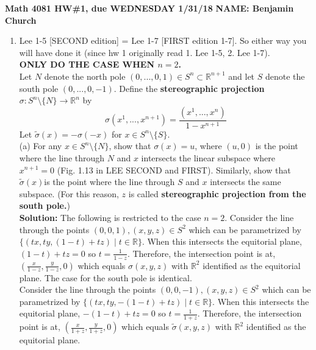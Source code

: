 \documentclass[12pt]{extarticle}
\newcommand{\R}{\mathbb{R}}
\begin{document}
\pagestyle{empty}

{\bf Math 4081 HW\#1, due WEDNESDAY 1/31/18} \hspace{.5in} \textbf{NAME: Benjamin Church} \hspace{4in}
\begin{enumerate}
\item Lee 1-5 [SECOND edition] = Lee 1-7 [FIRST edition 1-7].  So either way you will have done it (since hw 1 originally read 1. Lee 1-5, 2. Lee 1-7). \\


 \textbf{ONLY DO THE CASE WHEN $n=2$.}\\

Let $N$ denote the north pole $(0,...,0,1) \in S^n \subset \R^{n+1}$   and let $S$ denote the south pole $(0,...,0,-1)$. Define the \textbf{stereographic projection} $\sigma: S^n\setminus \{N\} \to \R^n$ by  
\[
\sigma(x^1,...,x^{n+1}) = \frac{(x^1,...,x^{n})}{1-x^{n+1}}
\]
Let $\widetilde{\sigma}(x) = -\sigma(-x)$ for $x\in S^n \setminus \{ S \}$. \\
(a) For any $x\in S^n \setminus \{N\}$, show that $\sigma(x)=u$, where $(u,0)$ is the point where the line through $N$ and $x$ intersects the linear subspace where $x^{n+1}=0$ (Fig. 1.13 in LEE SECOND and FIRST). Similarly, show that  $\widetilde{\sigma}(x) $is the point where the line through $S$ and $x$ intersects the same subspace. (For this reason,  $z$ is called \textbf{stereographic projection from the south pole.}) \\

\textbf{Solution:}
The following is restricted to the case $n = 2$.
Consider the line through the points $(0, 0, 1), (x, y, z) \in S^2$ which can be parametrized by $\{ (tx, ty, (1 - t) + tz) \mid t \in \R \}$. When this intersects the equitorial plane, $(1 - t) + tz = 0$ so $t = \frac{1}{1 - z}$. Therefore, the intersection point is at, $\left(\frac{x}{1 - z}, \frac{y}{1 - z}, 0 \right)$ which equals $\sigma(x, y, z)$ with $\R^2$ identified as the equitorial plane. The case for the south pole is identical. \bigskip \\ 
Consider the line through the points $(0, 0, -1), (x, y, z) \in S^2$ which can be parametrized by $\{ (tx, ty, -(1 - t) + tz) \mid t \in \R \}$. When this intersects the equitorial plane, $-(1 - t) + tz = 0$ so $t = \frac{1}{1 + z}$. Therefore, the intersection point is at, $\left(\frac{x}{1 + z}, \frac{y}{1 + z}, 0 \right)$ which equals $\tilde{\sigma}(x, y, z)$ with $\R^2$ identified as the equitorial plane.



\end{enumerate}
\end{document}
